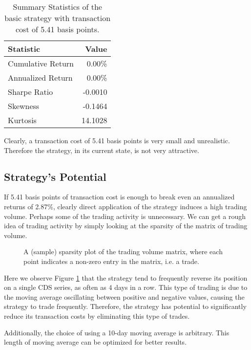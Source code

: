 \documentclass[11pt]{article}
\theoremstyle{definition}
\begin{document}
\begin{table}[h]
\centering
\begin{tabular}{ | l | r | }
  \hline      
  Statistic & Value \\
  \hline
  Cumulative Return & 0.00\% \\
  Annualized Return & 0.00\% \\
  Sharpe Ratio & -0.0010 \\
  Skewness & -0.1464 \\
  Kurtosis & 14.1028 \\
  \hline  
\end{tabular}
\caption{Summary Statistics of the basic strategy
  with transaction cost of 5.41 basis points.}
\label{tab:summary2}
\end{table}

Clearly, a transaction cost of 5.41 basis points 
is very small and unrealistic.
Therefore the strategy, in its current state,
is not very attractive.

\subsection{Strategy's Potential}

If 5.41 basis points of transaction cost
is enough to break even an annualized returns of 2.87\%, 
clearly direct application of the strategy 
induces a high trading volume.
Perhaps some of the trading activity is unnecessary.
We can get a rough idea of trading activity 
by simply looking at the sparsity of 
the matrix of trading volume.

\begin{figure}[h!]
\begin{center}
\end{center}
\centering
\caption{\label{fg:spy_volume}
A (sample) sparsity plot of the trading volume matrix,
where each point indicates a non-zero entry
in the matrix, i.e. a trade.
}
\end{figure}

Here we observe Figure \ref{fg:spy_volume} 
that the strategy tend to 
frequently reverse its position on a single CDS series,
as often as 4 days in a row.
This type of trading is due to the moving average 
oscillating between positive and negative values, 
causing the strategy to trade frequently.
Therefore, the strategy has potential to 
significantly reduce its transaction costs
by eliminating this type of trades.

Additionally, the choice of
using a 10-day moving average is arbitrary.
This length of moving average 
can be optimized for better results.
\end{document}
